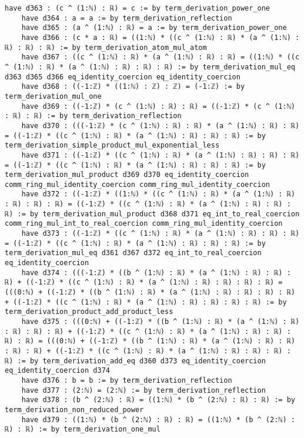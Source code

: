 \documentclass{article}
\begin{document}
\begin{tcolorbox}[colback=white!10, width=\linewidth]
\begin{lstlisting}[language=Lean4]
    have d363 : (c ^ (1:ℕ) : ℝ) = c := by term_derivation_power_one
    have d364 : a = a := by term_derivation_reflection
    have d365 : (a ^ (1:ℕ) : ℝ) = a := by term_derivation_power_one
    have d366 : (c * a : ℝ) = ((1:ℕ) * ((c ^ (1:ℕ) : ℝ) * (a ^ (1:ℕ) : ℝ) : ℝ) : ℝ) := by term_derivation_atom_mul_atom
    have d367 : ((c ^ (1:ℕ) : ℝ) * (a ^ (1:ℕ) : ℝ) : ℝ) = ((1:ℕ) * ((c ^ (1:ℕ) : ℝ) * (a ^ (1:ℕ) : ℝ) : ℝ) : ℝ) := by term_derivation_mul_eq d363 d365 d366 eq_identity_coercion eq_identity_coercion
    have d368 : ((-1:ℤ) * ((1:ℕ) : ℤ) : ℤ) = (-1:ℤ) := by term_derivation_mul_one
    have d369 : ((-1:ℤ) * (c ^ (1:ℕ) : ℝ) : ℝ) = ((-1:ℤ) * (c ^ (1:ℕ) : ℝ) : ℝ) := by term_derivation_reflection
    have d370 : (((-1:ℤ) * (c ^ (1:ℕ) : ℝ) : ℝ) * (a ^ (1:ℕ) : ℝ) : ℝ) = ((-1:ℤ) * ((c ^ (1:ℕ) : ℝ) * (a ^ (1:ℕ) : ℝ) : ℝ) : ℝ) := by term_derivation_simple_product_mul_exponential_less
    have d371 : ((-1:ℤ) * ((c ^ (1:ℕ) : ℝ) * (a ^ (1:ℕ) : ℝ) : ℝ) : ℝ) = ((-1:ℤ) * ((c ^ (1:ℕ) : ℝ) * (a ^ (1:ℕ) : ℝ) : ℝ) : ℝ) := by term_derivation_mul_product d369 d370 eq_identity_coercion comm_ring_mul_identity_coercion comm_ring_mul_identity_coercion
    have d372 : ((-1:ℤ) * ((1:ℕ) * ((c ^ (1:ℕ) : ℝ) * (a ^ (1:ℕ) : ℝ) : ℝ) : ℝ) : ℝ) = ((-1:ℤ) * ((c ^ (1:ℕ) : ℝ) * (a ^ (1:ℕ) : ℝ) : ℝ) : ℝ) := by term_derivation_mul_product d368 d371 eq_int_to_real_coercion comm_ring_mul_int_to_real_coercion comm_ring_mul_identity_coercion
    have d373 : ((-1:ℤ) * ((c ^ (1:ℕ) : ℝ) * (a ^ (1:ℕ) : ℝ) : ℝ) : ℝ) = ((-1:ℤ) * ((c ^ (1:ℕ) : ℝ) * (a ^ (1:ℕ) : ℝ) : ℝ) : ℝ) := by term_derivation_mul_eq d361 d367 d372 eq_int_to_real_coercion eq_identity_coercion
    have d374 : (((-1:ℤ) * ((b ^ (1:ℕ) : ℝ) * (a ^ (1:ℕ) : ℝ) : ℝ) : ℝ) + ((-1:ℤ) * ((c ^ (1:ℕ) : ℝ) * (a ^ (1:ℕ) : ℝ) : ℝ) : ℝ) : ℝ) = (((0:ℕ) + ((-1:ℤ) * ((b ^ (1:ℕ) : ℝ) * (a ^ (1:ℕ) : ℝ) : ℝ) : ℝ) : ℝ) + ((-1:ℤ) * ((c ^ (1:ℕ) : ℝ) * (a ^ (1:ℕ) : ℝ) : ℝ) : ℝ) : ℝ) := by term_derivation_product_add_product_less
    have d375 : (((0:ℕ) + ((-1:ℤ) * ((b ^ (1:ℕ) : ℝ) * (a ^ (1:ℕ) : ℝ) : ℝ) : ℝ) : ℝ) + ((-1:ℤ) * ((c ^ (1:ℕ) : ℝ) * (a ^ (1:ℕ) : ℝ) : ℝ) : ℝ) : ℝ) = (((0:ℕ) + ((-1:ℤ) * ((b ^ (1:ℕ) : ℝ) * (a ^ (1:ℕ) : ℝ) : ℝ) : ℝ) : ℝ) + ((-1:ℤ) * ((c ^ (1:ℕ) : ℝ) * (a ^ (1:ℕ) : ℝ) : ℝ) : ℝ) : ℝ) := by term_derivation_add_eq d360 d373 eq_identity_coercion eq_identity_coercion d374
    have d376 : b = b := by term_derivation_reflection
    have d377 : (2:ℕ) = (2:ℕ) := by term_derivation_reflection
    have d378 : (b ^ (2:ℕ) : ℝ) = ((1:ℕ) * (b ^ (2:ℕ) : ℝ) : ℝ) := by term_derivation_non_reduced_power
    have d379 : ((1:ℕ) * (b ^ (2:ℕ) : ℝ) : ℝ) = ((1:ℕ) * (b ^ (2:ℕ) : ℝ) : ℝ) := by term_derivation_one_mul

\end{lstlisting}
\end{tcolorbox}
\end{document}
